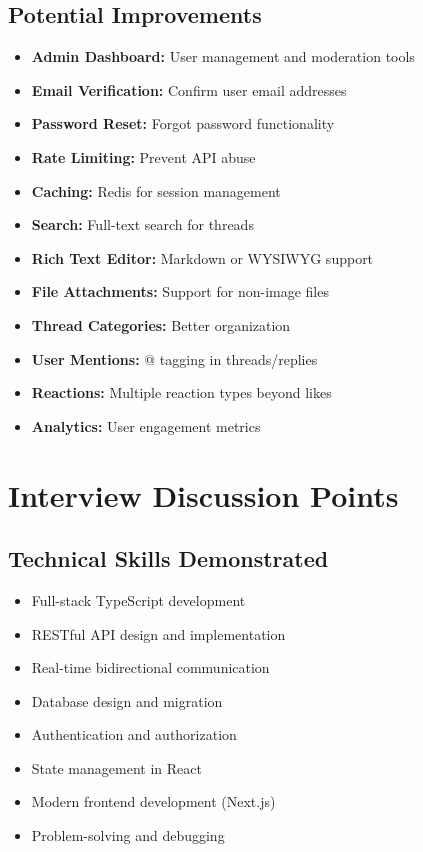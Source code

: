 \documentclass[11pt,a4paper]{article}
\begin{document}
\subsection{Potential Improvements}
\begin{itemize}[leftmargin=*]
    \item \textbf{Admin Dashboard:} User management and moderation tools
    \item \textbf{Email Verification:} Confirm user email addresses
    \item \textbf{Password Reset:} Forgot password functionality
    \item \textbf{Rate Limiting:} Prevent API abuse
    \item \textbf{Caching:} Redis for session management
    \item \textbf{Search:} Full-text search for threads
    \item \textbf{Rich Text Editor:} Markdown or WYSIWYG support
    \item \textbf{File Attachments:} Support for non-image files
    \item \textbf{Thread Categories:} Better organization
    \item \textbf{User Mentions:} @ tagging in threads/replies
    \item \textbf{Reactions:} Multiple reaction types beyond likes
    \item \textbf{Analytics:} User engagement metrics
\end{itemize}

\section{Interview Discussion Points}

\subsection{Technical Skills Demonstrated}
\begin{itemize}[leftmargin=*]
    \item Full-stack TypeScript development
    \item RESTful API design and implementation
    \item Real-time bidirectional communication
    \item Database design and migration
    \item Authentication and authorization
    \item State management in React
    \item Modern frontend development (Next.js)
    \item Problem-solving and debugging
\end{itemize}
\end{document}
